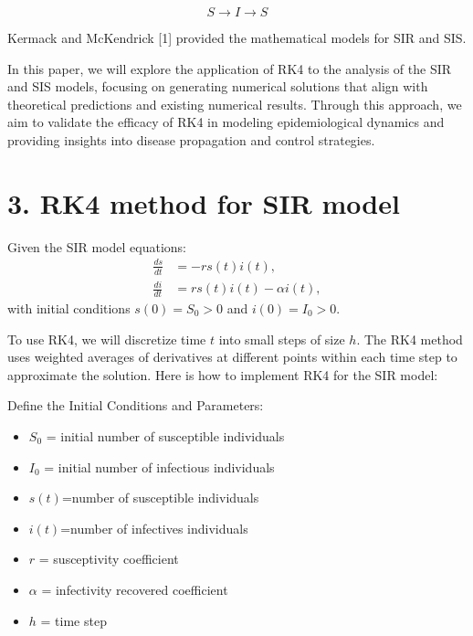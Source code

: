 \documentclass[10pt]{article}
\begin{document}
$$
S \rightarrow I \rightarrow S
$$

Kermack and McKendrick [1] provided the mathematical models for SIR and SIS.

In this paper, we will explore the application of RK4 to the analysis of the SIR and SIS models, focusing on generating numerical solutions that align with theoretical predictions and existing numerical results. Through this approach, we aim to validate the efficacy of RK4 in modeling epidemiological dynamics and providing insights into disease propagation and control strategies.


\section*{3. RK4 method for SIR model}

\vspace{2\baselineskip}
Given the SIR model equations:
\begin{align*}
\frac{ds}{dt} &= -r s(t) i(t), \\
\frac{di}{dt} &= r s(t) i(t) - \alpha i(t),
\end{align*}
with initial conditions \(s(0) = S_0>0\) and \(i(0) = I_0>0\).

To use RK4, we will discretize time \(t\) into small steps of size \(h\). The RK4 method uses weighted averages of derivatives at different points within each time step to approximate the solution. Here is how to implement RK4 for the SIR model:

Define the Initial Conditions and Parameters:
\begin{itemize}
    \item \(S_0\) = initial number of susceptible individuals
    \item \(I_0\) = initial number of infectious individuals
    \item \(s(t)\)=number of susceptible individuals
    \item \(i(t)\)=number of infectives individuals
    \item \(r\) = susceptivity coefficient
    \item \(\alpha\) = infectivity recovered coefficient
    \item \(h\) = time step
    
\end{itemize}
\end{document}

